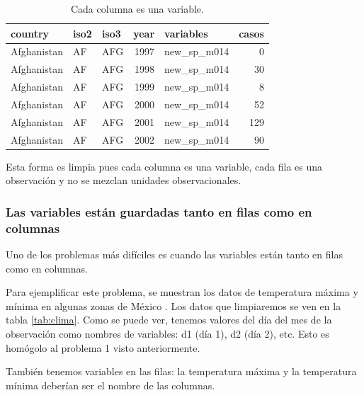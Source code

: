 \documentclass[]{article}
\begin{document}
\begin{table}[ht]
\centering
\begingroup\tiny
\begin{tabular}{lllrlr}
  \hline
country & iso2 & iso3 & year & variables & casos \\ 
  \hline
Afghanistan & AF & AFG & 1997 & new\_sp\_m014 &   0 \\ 
  Afghanistan & AF & AFG & 1998 & new\_sp\_m014 &  30 \\ 
  Afghanistan & AF & AFG & 1999 & new\_sp\_m014 &   8 \\ 
  Afghanistan & AF & AFG & 2000 & new\_sp\_m014 &  52 \\ 
  Afghanistan & AF & AFG & 2001 & new\_sp\_m014 & 129 \\ 
  Afghanistan & AF & AFG & 2002 & new\_sp\_m014 &  90 \\ 
   \hline
\end{tabular}
\endgroup
\caption{Cada columna es una variable.} 
\label{tab:varslimpios}
\end{table}

\begin{nota}[Nota] 
Esta forma es limpia pues cada columna es una variable, cada fila es una observación
y no se mezclan unidades observacionales.
\end{nota}

\subsubsection{Las variables están guardadas tanto en filas como en
columnas}\label{las-variables-estan-guardadas-tanto-en-filas-como-en-columnas}

Uno de los problemas más difíciles es cuando las variables están tanto
en filas como en columnas.

Para ejemplificar este problema, se muestran los datos de temperatura
máxima y mínima en algunas zonas de México
\parencite[][archivo data/weather.txt]{tidydata}. Los datos que
limpiaremos se ven en la tabla \ref{tab:clima}. Como se puede ver,
tenemos valores del día del mes de la observación como nombres de
variables: d1 (día 1), d2 (día 2), etc. Esto es homógolo al problema 1
visto anteriormente.

También tenemos variables en las filas: la temperatura máxima y la
temperatura mínima deberían ser el nombre de las columnas.
\end{document}
